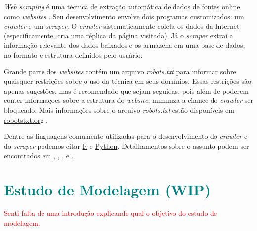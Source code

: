 \documentclass{automatextcc}
\newcommand{\nico}[1]{\textcolor{teal}{#1}}
\newcommand{\pumi}[1]{\textcolor{red}{#1}}
\begin{document}

\textit{Web scraping} é uma técnica de extração automática de dados de fontes online como \textit{websites} \citep{farley2017,khder2021}. Seu desenvolvimento envolve dois programas customizados: um \textit{crawler} e um \textit{scraper}. O \textit{crawler} sistematicamente coleta os dados da Internet (especificamente, cria uma réplica da página visitada). Já o \textit{scraper} extrai a informação relevante dos dados baixados e os armazena em uma base de dados, no formato e estrutura definidos pelo usuário. \citep{lawson2015,patil2016}

Grande parte dos \textit{websites} contém um arquivo \textit{robots.txt} para informar sobre quaisquer restrições sobre o uso da técnica em seus domínios. Essas restrições são apenas sugestões, mas é recomendado que sejam seguidas, pois além de poderem conter informações sobre a estrutura do \textit{website}, minimiza a chance do \textit{crawler} ser bloqueado. Mais informações sobre o arquivo \textit{robots.txt} estão disponíveis em \url{robotstxt.org} \citep{lawson2015}.

Dentre as linguagens comumente utilizadas para o desenvolvimento do \textit{crawler} e do \textit{scraper} podemos citar \href{https://cran.r-project.org}{R} e \href{https://python.org/}{Python}. Detalhamentos sobre o assunto podem ser encontrados em \citet{lawson2015}, \citet{sirisuriya2015}, \citet{patil2016}, \citet{farley2017} e \citet{khder2021}.



\chapter{\nico{Estudo de Modelagem (WIP)}}
\pumi{Senti falta de uma introdução explicando qual o objetivo do estudo de modelagem.}
\end{document}
